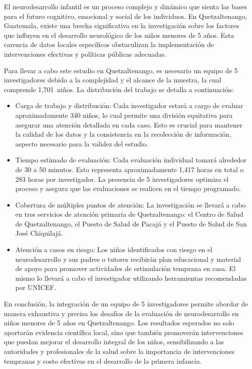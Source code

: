 \documentclass[11pt,letterpaper]{report}
\newcommand{\muestradeseada}{1,701}
\begin{document}
El neurodesarrollo infantil es un proceso complejo y dinámico que sienta las
bases para el futuro cognitivo, emocional y social de los individuos. En
Quetzaltenango, Guatemala, existe una brecha significativa en la investigación
sobre los factores que influyen en el desarrollo neurológico de los niños
menores de 5 años. Esta carencia de datos locales específicos obstaculizan la
implementación de intervenciones efectivas y políticas públicas adecuadas.

Para llevar a cabo este estudio en Quetzaltenango, es necesario un equipo de 5
investigadores debido a la complejidad y el alcance de la muestra, la cual
comprende \muestradeseada\ niños. La distribución del trabajo se detalla a
continuación:

	\begin{itemize}
		\item Carga de trabajo y distribución: Cada investigador estará a cargo
		de evaluar aproximadamente 340 niños, lo cual permite una división
		equitativa para asegurar una atención detallada en cada caso. Esto es
		crucial para mantener la calidad de los datos y la consistencia en la
		recolección de información, aspecto necesario para la validez del
		estudio.
		\item Tiempo estimado de evaluación: Cada evaluación individual tomará
		alrededor de 30 a 50 minutos. Esto representa aproximadamente 1,417
		horas en total o 283 horas por investigador. La presencia de 5
		investigadores optimiza el proceso y asegura que las evaluaciones se
		realicen en el tiempo programado.
		\item Cobertura de múltiples puntos de atención: La investigación se
		llevará a cabo en tres servicios de atención primaria de
		Quetzaltenango: el Centro de Salud de Quetzaltenango, el Puesto de
		Salud de Pacajá y el Puesto de Salud de San José Chiquilajá.
		\item Atención a casos en riesgo: Los niños identificados con riesgo en
		el neurodesarrollo y sus padres o tutores recibirán plan educacional y
		material de apoyo para promover actividades de estimulación temprana en
		casa. El mismo lo llevará a cabo el investigador utilizando
		herramientas recomendadas por UNICEF.
	\end{itemize}

En conclusión, la integración de un equipo de 5 investigadores permite abordar
de manera exhaustiva y precisa los desafíos de la evaluación de neurodesarrollo
en niños menores de 5 años en Quetzaltenango. Los resultados esperados no solo
aportarán evidencia científica local, sino que también promoverán
intervenciones que puedan mejorar el desarrollo integral de los niños,
sensibilizando a las autoridades y profesionales de la salud sobre la
importancia de intervenciones tempranas y costo efectivas en el desarrollo de
la primera infancia.
\end{document}
